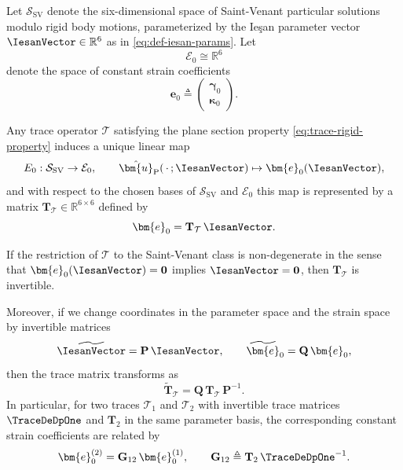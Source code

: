 \begin{Quote}
\begin{proposition}
Let $\mathcal{S}_{\mathrm{SV}}$ denote the six-dimensional space of 
Saint-Venant particular solutions modulo rigid body motions, parameterized 
by the Ieşan parameter vector $\IesanVector \in \mathbb{R}^6$ as in 
\eqref{eq:def-iesan-params}. Let 
\[
\mathcal{E}_0 \cong \mathbb{R}^6
\]
denote the space of constant strain coefficients
\[
\bm{e}_0 \triangleq \begin{pmatrix} \bm{\gamma}_0 \\ \bm{\kappa}_0 \end{pmatrix}.
\]

Any trace operator $\mathcal{T}$ satisfying the plane section property 
\eqref{eq:trace-rigid-property} induces a unique linear map
\[
E_0 : \mathcal{S}_{\mathrm{SV}} \to \mathcal{E}_0,
\qquad
\hat{\bm{u}}_{\mathrm{P}}(\,\cdot\,;\IesanVector) \mapsto \bm{e}_0(\IesanVector),
\]
and with respect to the chosen bases of $\mathcal{S}_{\mathrm{SV}}$ and 
$\mathcal{E}_0$ this map is represented by a matrix 
$\mathbf{T}_{\mathcal{T}} \in \mathbb{R}^{6\times 6}$ defined by
\begin{equation}
\bm{e}_0 = \mathbf{T}_{\mathcal{T}}\,\IesanVector.
\label{eq:def-trace-matrix-general}
\end{equation}

If the restriction of $\mathcal{T}$ to the Saint-Venant class is 
non-degenerate in the sense that $\bm{e}_0(\IesanVector) = \mathbf{0}$ implies 
$\IesanVector = \mathbf{0}$, then $\mathbf{T}_{\mathcal{T}}$ is invertible.

Moreover, if we change coordinates in the parameter space and the strain 
space by invertible matrices
\[
\widetilde{\IesanVector} = \mathbf{P}\,\IesanVector,
\qquad
\widetilde{\bm{e}}_0 = \mathbf{Q}\,\bm{e}_0,
\]
then the trace matrix transforms as
\begin{equation}
\widetilde{\mathbf{T}}_{\mathcal{T}} 
= \mathbf{Q}\,\mathbf{T}_{\mathcal{T}}\,\mathbf{P}^{-1}.
\label{eq:trace-matrix-change-of-basis}
\end{equation}
In particular, for two traces $\mathcal{T}_1$ and $\mathcal{T}_2$ with 
invertible trace matrices $\TraceDeDpOne$ and $\mathbf{T}_2$ in the same 
parameter basis, the corresponding constant strain coefficients are related by
\begin{equation}
\bm{e}_0^{(2)} = \mathbf{G}_{12}\,\bm{e}_0^{(1)},
\qquad
\mathbf{G}_{12} \triangleq \mathbf{T}_2\,\TraceDeDpOne^{-1}.
\label{eq:gauge-transform-general}
\end{equation}
\end{proposition}

\end{Quote}

